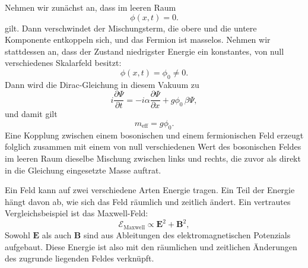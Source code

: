 Nehmen wir zunächst an, dass im leeren Raum
\begin{equation}
\phi(x,t)=0.
\end{equation}
gilt. Dann verschwindet der Mischungsterm, die obere und die untere Komponente entkoppeln sich, und das Fermion ist masselos. Nehmen wir stattdessen an, dass der Zustand niedrigster Energie ein konstantes, von null verschiedenes Skalarfeld besitzt:
\begin{equation}
\phi(x,t)=\phi_0\neq0.
\end{equation}
Dann wird die Dirac-Gleichung in diesem Vakuum zu
\begin{equation}
i\frac{\partial\Psi}{\partial t}
=
-i\alpha\frac{\partial\Psi}{\partial x}
+g\phi_0\,\beta\Psi,
\end{equation}
und damit gilt
\begin{equation}
m_{\mathrm{eff}}=g\phi_0.
\end{equation}
Eine Kopplung zwischen einem bosonischen und einem fermionischen Feld erzeugt folglich zusammen mit einem von null verschiedenen Wert des bosonischen Feldes im leeren Raum dieselbe Mischung zwischen links und rechts, die zuvor als direkt in die Gleichung eingesetzte Masse auftrat.

\begin{classroomqa}
\end{classroomqa}

\begin{classroomqa}
\end{classroomqa}

Ein Feld kann auf zwei verschiedene Arten Energie tragen. Ein Teil der Energie hängt davon ab, wie sich das Feld räumlich und zeitlich ändert. Ein vertrautes Vergleichsbeispiel ist das Maxwell-Feld:
\begin{equation}
\mathcal{E}_{\mathrm{Maxwell}}\propto \mathbf E^2+\mathbf B^2,
\end{equation}
Sowohl \(\mathbf E\) als auch \(\mathbf B\) sind aus Ableitungen des elektromagnetischen Potenzials aufgebaut. Diese Energie ist also mit den räumlichen und zeitlichen Änderungen des zugrunde liegenden Feldes verknüpft.

